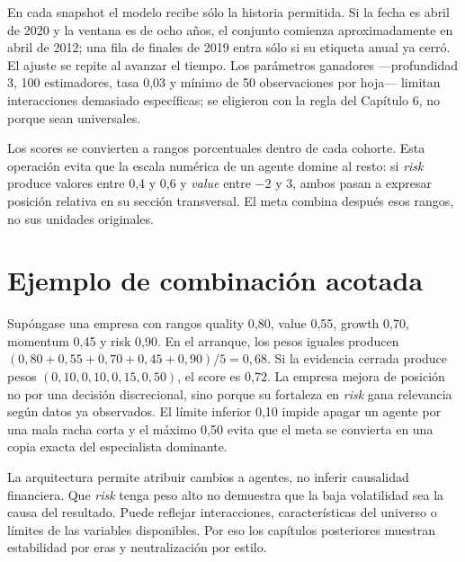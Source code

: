 En cada snapshot el modelo recibe sólo la historia permitida. Si la fecha es abril de 2020 y la
ventana es de ocho años, el conjunto comienza aproximadamente en abril de 2012; una fila de finales
de 2019 entra sólo si su etiqueta anual ya cerró. El ajuste se repite al avanzar el tiempo. Los
parámetros ganadores ---profundidad 3, 100 estimadores, tasa 0,03 y mínimo de 50 observaciones por
hoja--- limitan interacciones demasiado específicas; se eligieron con la regla del Capítulo 6, no
porque sean universales.

Los scores se convierten a rangos porcentuales dentro de cada cohorte. Esta operación evita que la
escala numérica de un agente domine al resto: si \textit{risk} produce valores entre 0,4 y 0,6 y
\textit{value} entre $-2$ y $3$, ambos pasan a expresar posición relativa en su sección transversal.
El meta combina después esos rangos, no sus unidades originales.

\section{Ejemplo de combinación acotada}

Supóngase una empresa con rangos quality 0,80, value 0,55, growth 0,70, momentum 0,45 y risk 0,90.
En el arranque, los pesos iguales producen $(0,80+0,55+0,70+0,45+0,90)/5=0,68$. Si la evidencia
cerrada produce pesos $(0,10,0,10,0,15,0,50)$, el score es 0,72. La empresa mejora de posición no
por una decisión discrecional, sino porque su fortaleza en \textit{risk} gana relevancia según datos
ya observados. El límite inferior 0,10 impide apagar un agente por una mala racha corta y el máximo
0,50 evita que el meta se convierta en una copia exacta del especialista dominante.

La arquitectura permite atribuir cambios a agentes, no inferir causalidad financiera. Que
\textit{risk} tenga peso alto no demuestra que la baja volatilidad sea la causa del resultado. Puede
reflejar interacciones, características del universo o límites de las variables disponibles. Por eso
los capítulos posteriores muestran estabilidad por eras y neutralización por estilo.
